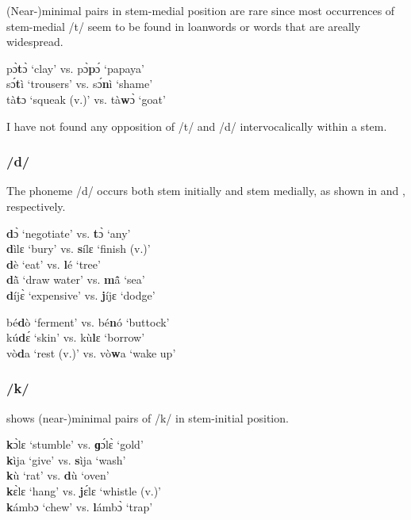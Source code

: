 \sloppy
\noindent
(Near-)minimal pairs in stem-medial position are rare since most occurrences of stem-medial /t/ seem to be found in loanwords or words that are areally wide\-spread.
\fussy

\ea \label{tm}
pɔ̀{\bfseries t}ɔ̀ `clay' vs. pɔ̀{\bfseries p}ɔ́ `papaya' \\
sɔ́{\bfseries t}ì `trousers' vs. sɔ́{\bfseries n}ì `shame' \\
tà{\bfseries t}ɔ `squeak (v.)' vs. tà{\bfseries w}ɔ̀ `goat'
\z

\noindent I have not found any opposition of /t/ and /d/ intervocalically within a stem.

\subsubsection*{\bfseries /d/} The phoneme /d/ occurs both stem initially and stem medially, as shown in  and , respectively.

\ea \label{d}
{\bfseries d}ɔ̀ `negotiate' vs. {\bfseries t}ɔ̀ `any' \\
{\bfseries d}ìlɛ `bury' vs. {\bfseries s}ílɛ `finish (v.)' \\
{\bfseries d}è `eat' vs. {\bfseries l}é `tree' \\
{\bfseries d}ã̀ `draw water' vs. {\bfseries m}ã̂ `sea' \\
{\bfseries d}íjɛ̀ `expensive' vs. {\bfseries j}íjɛ `dodge'
\z


\ea \label{dm}
bé{\bfseries d}ò `ferment' vs. bé{\bfseries n}ó `buttock' \\
kú{\bfseries d}ɛ́ `skin' vs. kù{\bfseries l}ɛ `borrow' \\
vò{\bfseries d}a `rest (v.)' vs. vò{\bfseries w}a `wake up'
\z


\subsubsection*{\bfseries /k/}  shows (near-)minimal pairs of /k/ in stem-initial position.

\ea \label{k}
{\bfseries k}ɔ̀lɛ `stumble' vs. {\bfseries ɡ}ɔ́lɛ̀ `gold' \\
{\bfseries k}ìja `give' vs. {\bfseries s}ìja `wash' \\
{\bfseries k}ù `rat' vs. {\bfseries d}ù `oven' \\
{\bfseries k}ɛ̀lɛ `hang' vs. {\bfseries j}ɛ́lɛ `whistle (v.)'  \\
{\bfseries k}ámbɔ `chew' vs. {\bfseries l}ámbɔ̀ `trap'
\z

